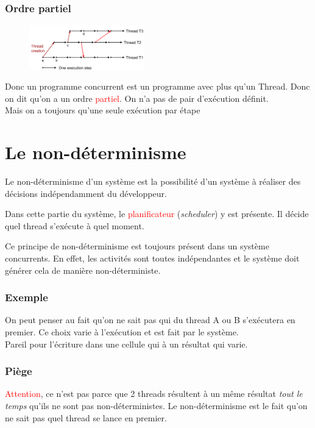 \documentclass{report}
\begin{document}
\subsubsection{Ordre partiel}
\begin{figure}
\centering
\includegraphics[width=5cm]{img/ordrePartiel.png}
\end{figure}
Donc un programme concurrent est un programme avec plus qu'un Thread. Donc on dit qu'on a un ordre \textcolor{red}{partiel}. On n'a pas de pair d'exécution définit.\\
Mais on a toujours qu'une seule exécution par étape

\section{Le non-déterminisme}
Le non-déterminisme d'un système est la possibilité d'un système à réaliser des décisions indépendamment du développeur.\par
Dans cette partie du système, le \textcolor{red}{planificateur} (\textit{scheduler}) y est présente. Il décide quel thread s'exécute à quel moment.\par
Ce principe de non-déterminisme est toujours présent dans un système concurrents. En effet, les activités sont toutes indépendantes et le système doit générer cela de manière non-déterministe.
\subsubsection{Exemple}
On peut penser au fait qu'on ne sait pas qui du thread A ou B s'exécutera en premier. Ce choix varie à l'exécution et est fait par le système.\\
Pareil pour l'écriture dans une cellule qui à un résultat qui varie.\par

\subsubsection{Piège}
\textcolor{red}{Attention}, ce n'est pas parce que 2 threads résultent à un même résultat \textit{tout le temps} qu'ils ne sont pas non-déterministes. Le non-déterminisme est le fait qu'on ne sait pas quel thread se lance en premier.
\end{document}
